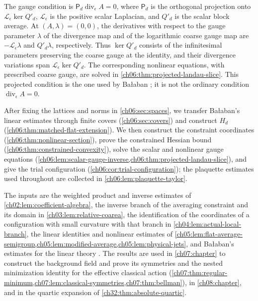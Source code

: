 The gauge condition is $\mathsf P_d\operatorname{div}_\epsilon A=0$, where $\mathsf P_d$ is the orthogonal projection onto $\mathscr L_\epsilon\ker Q'_d$, $\mathscr L_\epsilon$ is the positive scalar Laplacian, and $Q'_d$ is the scalar block average. At $(A,\lambda)=(0,0)$, the derivatives with respect to the gauge parameter $\lambda$ of the divergence map and of the logarithmic coarse gauge map are $-\mathscr L_\epsilon\lambda$ and $Q'_d\lambda$, respectively. Thus $\ker Q'_d$ consists of the infinitesimal parameters preserving the coarse gauge at the identity, and their divergence variations span $\mathscr L_\epsilon\ker Q'_d$. The corresponding nonlinear equations, with prescribed coarse gauge, are solved in \cref{ch06:thm:projected-landau-slice}. This projected condition is the one used by Bałaban \cite[(1.39)--(1.44), pp.~24--25]{Balaban1984I}; it is not the ordinary condition $\operatorname{div}_\epsilon A=0$.

After fixing the lattices and norms in \cref{ch06:sec:spaces}, we transfer Bałaban's linear estimates through finite covers (\cref{ch06:sec:covers}) and construct $H_d$ (\cref{ch06:thm:matched-flat-extension}). We then construct the constraint coordinates (\cref{ch06:thm:nonlinear-section}), prove the constrained Hessian bound (\cref{ch06:thm:constrained-convexity}), solve the scalar and nonlinear gauge equations (\cref{ch06:lem:scalar-gauge-inverse,ch06:thm:projected-landau-slice}), and give the trial configuration (\cref{ch06:cor:trial-configuration}); the plaquette estimates used throughout are collected in \cref{ch06:lem:plaquette-taylor}.

The inputs are the weighted product and inverse estimates of \cref{ch02:lem:coefficient-algebra}, the inverse branch of the averaging constraint and its domain in \cref{ch03:lem:relative-coarea}, the identification of the coordinates of a configuration with small curvature with that branch in \cref{ch04:lem:actual-local-branch}, the linear identities and nonlinear estimates of \cref{ch05:lem:flat-average-semigroup,ch05:lem:modified-average,ch05:lem:physical-jets}, and Bałaban's estimates for the linear theory \cite{Balaban1984I,Balaban1984II,Balaban1985Background}. The results are used in \cref{ch07:chapter} to construct the background field and prove its symmetries and the nested minimization identity for the effective classical action (\cref{ch07:thm:regular-minimum,ch07:lem:classical-symmetries,ch07:thm:bellman}), in \cref{ch08:chapter}, and in the quartic expansion of \cref{ch32:thm:absolute-quartic}.

